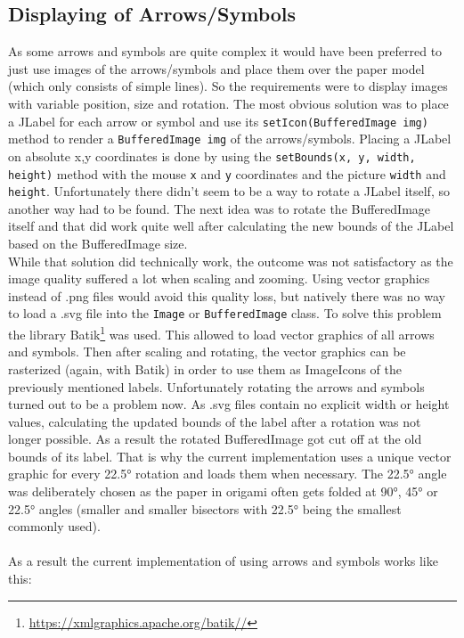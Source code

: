 \subsection{Displaying of Arrows/Symbols}
\label{sec:displaySymbols}
As some arrows and symbols are quite complex it would have been preferred to just use images of the arrows/symbols and place them over the  paper model (which only consists of simple lines). So the requirements were to display images with variable position, size and rotation. The most obvious solution was to place a JLabel for each arrow or symbol and use its \texttt{setIcon(BufferedImage img)} method to render a \texttt{BufferedImage img} of the arrows/symbols. Placing a JLabel on absolute x,y coordinates is done by using the \texttt{setBounds(x, y, width, height)} method with the mouse \texttt{x} and \texttt{y} coordinates and the picture \texttt{width} and \texttt{height}. Unfortunately there didn't seem to be a way to rotate a JLabel itself, so another way had to be found. The next idea was to rotate the BufferedImage itself and that did work quite well after calculating the new bounds of the JLabel based on the BufferedImage size.\\
While that solution did technically work, the outcome was not satisfactory as the image quality suffered a lot when scaling and zooming. Using vector graphics instead of .png files would avoid this quality loss, but natively there was no way to load a .svg file into the \texttt{Image} or \texttt{BufferedImage} class. To solve this problem the library Batik\footnote{\url{https://xmlgraphics.apache.org/batik//}} was used. This allowed to load vector graphics of all arrows and symbols. Then after scaling and rotating, the vector graphics can be rasterized (again, with Batik) in order to use them as ImageIcons of the previously mentioned labels. Unfortunately rotating the arrows and symbols turned out to be a problem now. As .svg files contain no explicit width or height values, calculating the updated bounds of the label after a rotation was not longer possible. As a result the rotated BufferedImage got cut off at the old bounds of its label. That is why the current implementation uses a unique vector graphic for every 22.5° rotation and loads them when necessary. The 22.5° angle was deliberately chosen as the paper in origami often gets folded at 90°, 45° or 22.5° angles (smaller and smaller bisectors with 22.5° being the smallest commonly used).\\%
\\
As a result the current implementation of using arrows and symbols works like this:

